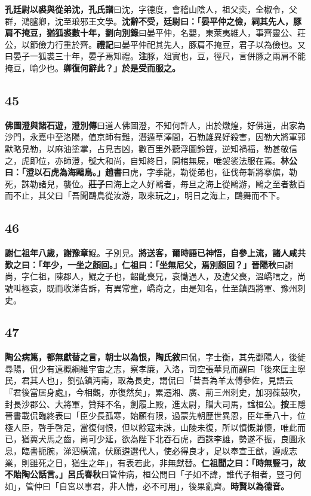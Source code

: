 \textbf{孔廷尉以裘與從弟沈，}{\footnotesize \textbf{孔氏譜}曰沈，字德度，會稽山陰人，祖父奕，全椒令，父群，鴻臚卿，沈至琅邪王文學。}\textbf{沈辭不受，廷尉曰：「晏平仲之儉，祠其先人，豚肩不掩豆，猶狐裘數十年，}{\footnotesize \textbf{劉向別錄}曰晏平仲，名嬰，東萊夷維人，事齊靈公、莊公，以節儉力行重於齊。\textbf{禮記}曰晏平仲祀其先人，豚肩不掩豆，君子以為儉也。又曰晏子一狐裘三十年，晏子焉知禮。\textbf{注}豚，俎實也，豆，徑尺，言併豚之兩肩不能掩豆，喻少也。}\textbf{卿復何辭此？」於是受而服之。}

\subsection*{45}

\textbf{佛圖澄與諸石遊，}{\footnotesize \textbf{澄別傳}曰道人佛圖澄，不知何許人，出於燉煌，好佛道，出家為沙門，永嘉中至洛陽，值京師有難，潛遁草澤間，石勒雄異好殺害，因勒大將軍郭默略見勒，以麻油塗掌，占見吉凶，數百里外聽浮圖鈴聲，逆知禍福，勒甚敬信之，虎即位，亦師澄，號大和尚，自知終日，開棺無屍，唯袈裟法服在焉。}\textbf{林公曰：「澄以石虎為海鷗鳥。」}{\footnotesize \textbf{趙書}曰虎，字季龍，勒從弟也，征伐毎斬將搴旗，勒死，誅勒諸兒，襲位。\textbf{莊子}曰海上之人好鷗者，毎旦之海上從鷗游，鷗之至者數百而不止，其父曰「吾聞鷗鳥從汝游，取來玩之」，明日之海上，鷗舞而不下。}

\subsection*{46}

\textbf{謝仁祖年八歲，謝豫章}{\footnotesize 鯤。子別見。}\textbf{將送客，爾時語已神悟，自參上流，諸人咸共歎之曰：「年少，一坐之顏回。」仁祖曰：「坐無尼父，焉別顏回？」}{\footnotesize \textbf{晉陽秋}曰謝尚，字仁祖，陳郡人，鯤之子也，齠齔喪兄，哀慟過人，及遭父喪，溫嶠唁之，尚號叫極哀，既而收涕告訴，有異常童，嶠奇之，由是知名，仕至鎮西將軍、豫州刺史。}

\subsection*{47}

\textbf{陶公病篤，都無獻替之言，朝士以為恨，}{\footnotesize \textbf{陶氏敘}曰侃，字士衡，其先鄱陽人，後徙尋陽，侃少有遠概綱維宇宙之志，察孝廉，入洛，司空張華見而謂曰「後來匡主寧民，君其人也」，劉弘鎮沔南，取為長史，謂侃曰「昔吾為羊太傅參佐，見語云『君後當居身處』，今相觀，亦復然矣」，累遷湘、廣、荊三州刺史，加羽葆鼓吹，封長沙郡公、大將軍，贊拜不名，劍履上殿，進太尉，贈大司馬，諡桓公。\textbf{按}王隱晉書載侃臨終表曰「臣少長孤寒，始願有限，過蒙先朝歷世異恩，臣年垂八十，位極人臣，啓手啓足，當復何恨，但以餘寇未誅，山陵未復，所以憤慨兼懷，唯此而已，猶冀犬馬之齒，尚可少延，欲為陛下北吞石虎，西誅李雄，勢遂不振，良圖永息，臨書扼腕，涕泗橫流，伏願遴選代人，使必得良才，足以奉宣王猷，遵成志業，則雖死之日，猶生之年」，有表若此，非無獻替。}\textbf{仁祖聞之曰：「時無豎刁，故不貽陶公話言。」}{\footnotesize \textbf{呂氏春秋}曰管仲病，桓公問曰「子如不諱，誰代子相者，豎刁何如」，管仲曰「自宮以事君，非人情，必不可用」，後果亂齊。}\textbf{時賢以為德音。}

